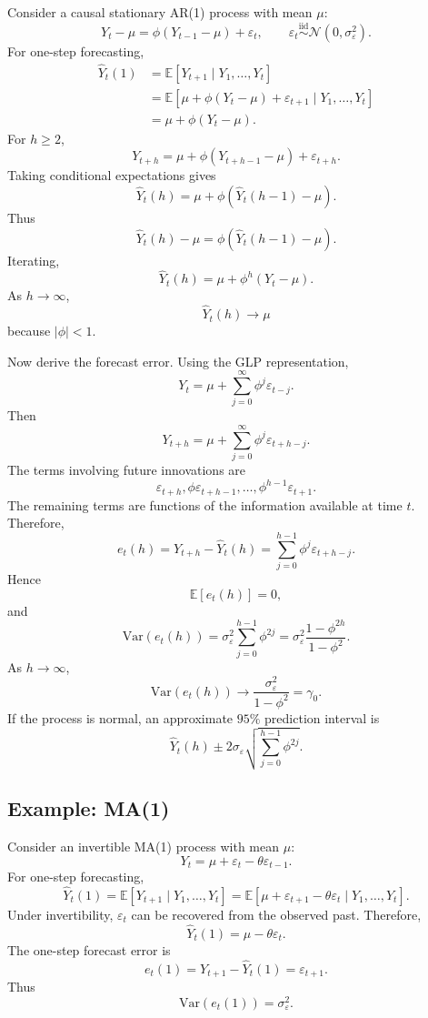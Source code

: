 \documentclass[12pt,oneside]{book}
\numberwithin{equation}{section}
\theoremstyle{definition}
\theoremstyle{plain}
\theoremstyle{remark}
\newcommand{\E}{\mathbb{E}}
\newcommand{\Var}{\mathrm{Var}}
\newcommand{\iid}{\overset{\text{iid}}{\sim}}
\newcommand{\Normal}{\mathcal{N}}
\begin{document}
Consider a causal stationary AR(1) process with mean $\mu$:
\[
Y_t-\mu=\phi(Y_{t-1}-\mu)+\varepsilon_t,
\qquad
\varepsilon_t\iid \Normal(0,\sigma_\varepsilon^2).
\]
For one-step forecasting,
\begin{align*}
\widehat{Y}_t(1)
&=
\E[Y_{t+1}\mid Y_1,\ldots,Y_t] \\
&=
\E[\mu+\phi(Y_t-\mu)+\varepsilon_{t+1}\mid Y_1,\ldots,Y_t] \\
&=
\mu+\phi(Y_t-\mu).
\end{align*}
For $h\geq 2$,
\[
Y_{t+h}
=
\mu+\phi(Y_{t+h-1}-\mu)+\varepsilon_{t+h}.
\]
Taking conditional expectations gives
\[
\widehat{Y}_t(h)
=
\mu+\phi(\widehat{Y}_t(h-1)-\mu).
\]
Thus
\[
\widehat{Y}_t(h)-\mu
=
\phi(\widehat{Y}_t(h-1)-\mu).
\]
Iterating,
\[
\widehat{Y}_t(h)
=
\mu+\phi^h(Y_t-\mu).
\]
As $h\to\infty$,
\[
\widehat{Y}_t(h)\to \mu
\]
because $|\phi|<1$.

Now derive the forecast error. Using the GLP representation,
\[
Y_t=\mu+\sum_{j=0}^{\infty}\phi^j\varepsilon_{t-j}.
\]
Then
\[
Y_{t+h}
=
\mu+\sum_{j=0}^{\infty}\phi^j\varepsilon_{t+h-j}.
\]
The terms involving future innovations are
\[
\varepsilon_{t+h},
\phi\varepsilon_{t+h-1},
\ldots,
\phi^{h-1}\varepsilon_{t+1}.
\]
The remaining terms are functions of the information available at time $t$. Therefore,
\[
e_t(h)
=
Y_{t+h}-\widehat{Y}_t(h)
=
\sum_{j=0}^{h-1}\phi^j\varepsilon_{t+h-j}.
\]
Hence
\[
\E[e_t(h)]=0,
\]
and
\[
\Var(e_t(h))
=
\sigma_\varepsilon^2
\sum_{j=0}^{h-1}\phi^{2j}
=
\sigma_\varepsilon^2
\frac{1-\phi^{2h}}{1-\phi^2}.
\]
As $h\to\infty$,
\[
\Var(e_t(h))
\to
\frac{\sigma_\varepsilon^2}{1-\phi^2}
=
\gamma_0.
\]
If the process is normal, an approximate $95\%$ prediction interval is
\[
\widehat{Y}_t(h)
\pm
2\sigma_\varepsilon
\sqrt{
\sum_{j=0}^{h-1}\phi^{2j}
}.
\]

\subsection*{Example: MA(1)}

Consider an invertible MA(1) process with mean $\mu$:
\[
Y_t=\mu+\varepsilon_t-\theta\varepsilon_{t-1}.
\]
For one-step forecasting,
\[
\widehat{Y}_t(1)
=
\E[Y_{t+1}\mid Y_1,\ldots,Y_t]
=
\E[\mu+\varepsilon_{t+1}-\theta\varepsilon_t\mid Y_1,\ldots,Y_t].
\]
Under invertibility, $\varepsilon_t$ can be recovered from the observed past. Therefore,
\[
\widehat{Y}_t(1)=\mu-\theta\varepsilon_t.
\]
The one-step forecast error is
\[
e_t(1)
=
Y_{t+1}-\widehat{Y}_t(1)
=
\varepsilon_{t+1}.
\]
Thus
\[
\Var(e_t(1))=\sigma_\varepsilon^2.
\]
\end{document}
